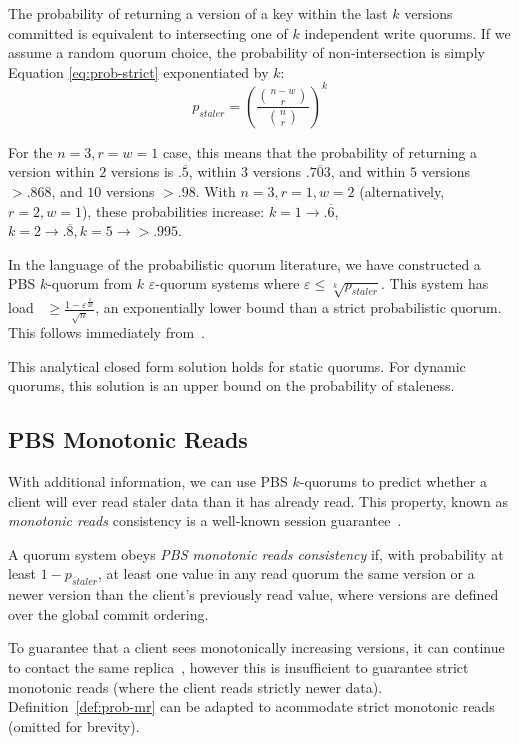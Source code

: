 \documentclass{vldb}
\begin{document}
The probability of returning a version of a key within the last $k$
versions committed is equivalent to intersecting one of $k$
independent write quorums.  If we assume a random quorum choice, the
probability of non-intersection is simply Equation
\ref{eq:prob-strict} exponentiated by $k$:
\begin{equation}
\label{eq:k-consistency}
p_{staler} = \left(\frac{{n-w \choose r}}{{n \choose r}}\right)^k
\end{equation}

For the $n=3, r=w=1$ case, this means that the probability of
returning a version within $2$ versions is $.\overline{5}$, within $3$
versions $.\overline{703}$, and within $5$ versions $> .868$, and $10$
versions $>.98$.  With $n=3, r=1, w=2$ (alternatively, $r=2, w=1$),
these probabilities increase: $k=1 \rightarrow
.\overline{6}$, $k=2 \rightarrow .\overline{8}, k=5 \rightarrow >
.995$.

In the language of the probabilistic quorum literature, we have
constructed a PBS $k$-quorum from $k$ $\varepsilon$-quorum systems
where $\varepsilon \leq \sqrt[k]{p_{staler}}$. This system has load~\cite{needed}
$\geq \frac{1-\varepsilon^{\frac{1}{2k}}}{\sqrt{n}}$, an exponentially
lower bound than a strict probabilistic quorum.  This follows
immediately from~\cite[Corollary 3.12]{prob-quorum}.

This analytical closed form solution holds for static quorums.  For
dynamic quorums, this solution is an upper bound on the probability of
staleness.

\subsection{PBS Monotonic Reads}

With additional information, we can use PBS $k$-quorums to predict
whether a client will ever read staler data than it has already read.
This property, known as \textit{monotonic reads} consistency is a
well-known session guarantee~\cite{sessionguarantees}.

\begin{definition}
\label{def:prob-mr}
A quorum system obeys \textit{PBS monotonic reads consistency} if,
with probability at least $1-p_{staler}$, at least one value in any
read quorum the same version or a newer version than the client's
previously read value, where versions are defined over the global
commit ordering.
\end{definition}

To guarantee that a client sees monotonically increasing versions, it
can continue to contact the same replica~\cite{vogels-defs}, however
this is insufficient to guarantee strict monotonic reads (where the
client reads strictly newer data).  Definition~\ref{def:prob-mr} can
be adapted to acommodate strict monotonic reads (omitted for brevity).
\end{document}
